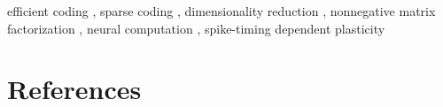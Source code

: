 \documentclass[review,12pt,sort&compress,openany,oneside]{elsarticle}
\begin{document}
\begin{frontmatter}

\makeatletter
\def\@xfootnote[#1]{%
  \protected@xdef\@thefnmark{#1}%
  \@footnotemark\@footnotetext}
\makeatother


\begin{keyword}
efficient coding \sep
sparse coding \sep
dimensionality reduction \sep
nonnegative matrix factorization \sep
neural computation \sep
spike-timing dependent plasticity
\end{keyword}

\end{frontmatter}


\let\oldcleartorecto\cleartorecto %
\let\cleartorecto\newpage         %


\setcounter{secnumdepth}{0} %







% 


% 
% 

% 


\section{References}


\end{document}
